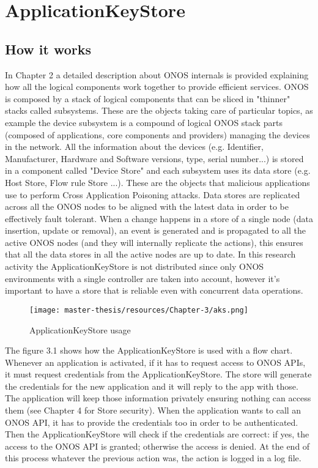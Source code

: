 \documentclass[a4paper,10pt]{memoir}
\begin{document}
\section{ApplicationKeyStore}

\subsection{How it works}
In Chapter 2 a detailed description about ONOS internals is provided explaining how all the logical components work together to provide efficient services. ONOS is composed by a stack of logical components that can be sliced in "thinner" stacks called subsystems. These are the objects taking care of particular topics, as example the device subsystem is a compound of logical ONOS stack parts (composed of applications, core components and providers) managing the devices in the network. All the information about the devices (e.g. Identifier, Manufacturer, Hardware and Software versions, type, serial number...) is stored in a component called "Device Store" and each subsystem uses its data store (e.g. Host Store, Flow rule Store ...). These are the objects that malicious applications use to perform Cross Application Poisoning attacks. Data stores are replicated across all the ONOS nodes to be aligned with the latest data in order to be effectively fault tolerant. When a change happens in a store of a single node (data insertion, update or removal), an event is generated and is propagated to all the active ONOS nodes (and they will internally replicate the actions), this ensures that all the data stores in all the active nodes are up to date. In this research activity the ApplicationKeyStore is not distributed since only ONOS environments with a single controller are taken into account, however it's important to have a store that is reliable even with concurrent data operations.

\begin{figure}[h]
\caption{ApplicationKeyStore usage}
\label{fig:aks}
\texttt{[image: master-thesis/resources/Chapter-3/aks.png]}
\centering
\end{figure}

The figure 3.1 shows how the ApplicationKeyStore is used with a flow chart. Whenever an application is activated, if it has to request access to ONOS APIs, it must request credentials from the ApplicationKeyStore. The store will generate the credentials for the new application and it will reply to the app with those. The application will keep those information privately ensuring nothing can access them (see Chapter 4 for Store security). When the application wants to call an ONOS API, it has to provide the credentials too in order to be authenticated. Then the ApplicationKeyStore will check if the credentials are correct: if yes, the access to the ONOS API is granted; otherwise the access is denied. At the end of this process whatever the previous action was, the action is logged in a log file.
\end{document}

